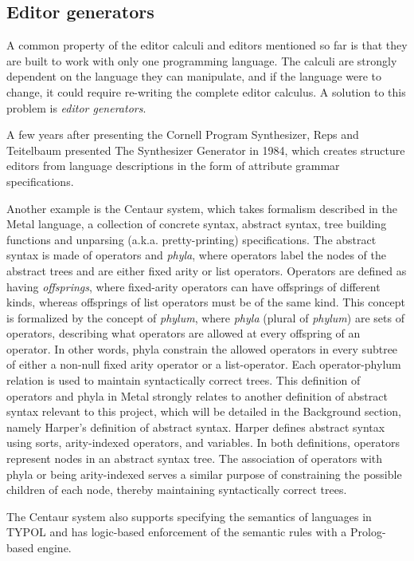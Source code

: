 \subsection{Editor generators}
A common property of the editor calculi and editors mentioned so far is that they are built to work with only one programming language. The calculi are strongly dependent on the language they can manipulate, and if the language were to change, it could require re-writing the complete editor calculus. A solution to this problem is \textit{editor generators}.

A few years after presenting the Cornell Program Synthesizer, Reps and Teitelbaum presented The Synthesizer Generator\cite{timtom84} in 1984, which creates structure editors from language descriptions in the form of attribute grammar specifications.

Another example is the Centaur system\cite{centaur}, which takes formalism described in the Metal language\cite{metal}, a collection of concrete syntax, abstract syntax, tree building functions and unparsing (a.k.a. pretty-printing) specifications. The abstract syntax is made of operators and \textit{phyla}, where operators label the nodes of the abstract trees and are either fixed arity or list operators. Operators are defined as having \textit{offsprings}, where fixed-arity operators can have offsprings of different kinds, whereas offsprings of list operators must be of the same kind. This concept is formalized by the concept of \textit{phylum}, where \textit{phyla} (plural of \textit{phylum}) are sets of operators, describing what operators are allowed at every offspring of an operator. In other words, phyla constrain the allowed operators in every subtree of either a non-null fixed arity operator or a list-operator. Each operator-phylum relation is used to maintain syntactically correct trees.
This definition of operators and phyla in Metal strongly relates to another definition of abstract syntax relevant to this project, which will be detailed in the Background section, namely Harper's definition of abstract syntax\cite{harper}. Harper defines abstract syntax using sorts, arity-indexed operators, and variables. In both definitions, operators represent nodes in an abstract syntax tree. The association of operators with phyla or being arity-indexed serves a similar purpose of constraining the possible children of each node, thereby maintaining syntactically correct trees.

The Centaur system\cite{centaur} also supports specifying the semantics of languages in TYPOL\cite{TYPOL} and has logic-based enforcement of the semantic rules with a Prolog-based engine.

